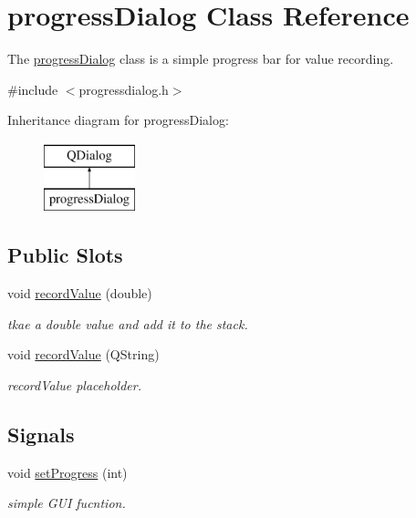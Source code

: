 \hypertarget{classprogress_dialog}{\section{progress\+Dialog Class Reference}
\label{classprogress_dialog}
}


The \hyperlink{classprogress_dialog}{progress\+Dialog} class is a simple progress bar for value recording.  




{\ttfamily \#include $<$progressdialog.\+h$>$}

Inheritance diagram for progress\+Dialog\+:\begin{figure}[H]
\begin{center}
\leavevmode
\includegraphics[height=2.000000cm]{classprogress_dialog}
\end{center}
\end{figure}
\subsection*{Public Slots}
\begin{DoxyCompactItemize}
\item 
void \hyperlink{classprogress_dialog_ac6b3d582453f56d5f86758bbef380e52}{record\+Value} (double)
\begin{DoxyCompactList}\small\item\em tkae a double value and add it to the stack. \end{DoxyCompactList}\item 
void \hyperlink{classprogress_dialog_acf8d15fdaea84dd2cfb07305aa973776}{record\+Value} (Q\+String)
\begin{DoxyCompactList}\small\item\em record\+Value placeholder. \end{DoxyCompactList}\end{DoxyCompactItemize}
\subsection*{Signals}
\begin{DoxyCompactItemize}
\item 
void \hyperlink{classprogress_dialog_ab5054e13998ff01af0fa74c5703365d0}{set\+Progress} (int)
\begin{DoxyCompactList}\small\item\em simple G\+U\+I fucntion. \end{DoxyCompactList}\end{DoxyCompactItemize}

